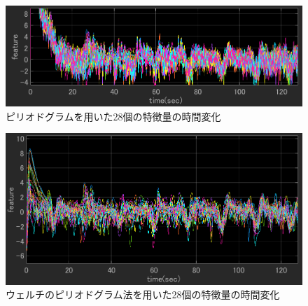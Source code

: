 \begin{figure}[tp]
    \centering
    \includegraphics[width=13cm]{images/feature_sub1_fft.png}
    \caption{ピリオドグラムを用いた28個の特徴量の時間変化}
    \label{fig:fftERD}
\end{figure}
\begin{figure}[tp]
    \centering
    \includegraphics[width=13cm]{images/feature_sub1_welch.png}
    \caption{ウェルチのピリオドグラム法を用いた28個の特徴量の時間変化}
    \label{fig:welchERD}
\end{figure}